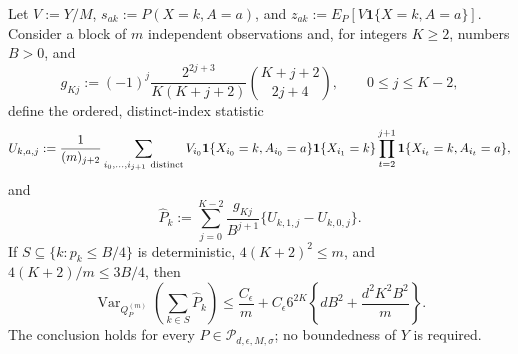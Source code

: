 Let \(V:=Y/M\), \(s_{ak}:=P(X=k,A=a)\), and \(z_{ak}:=E_P[V\mathbf 1\{X=k,A=a\}]\).  Consider a block of \(m\) independent observations and, for integers \(K\ge2\), numbers \(B>0\), and
\[
 g_{Kj}:=(-1)^j\frac{2^{2j+3}}{K(K+j+2)}\binom{K+j+2}{2j+4},\qquad 0\le j\le K-2,
\]
define the ordered, distinct-index statistic
\[
 U_{k,a,j}:=\frac{1}{(m)_{j+2}}
 \sum_{i_0,\ldots,i_{j+1}\ {\rm distinct}}
 V_{i_0}\mathbf 1\{X_{i_0}=k,A_{i_0}=a\}
 \mathbf 1\{X_{i_1}=k\}
 \prod_{t=2}^{j+1}\mathbf 1\{X_{i_t}=k,A_{i_t}=a\},
\]
and
\[
 \widehat P_k:=\sum_{j=0}^{K-2}\frac{g_{Kj}}{B^{j+1}}
 \{U_{k,1,j}-U_{k,0,j}\}.
\]
If \(S\subseteq\{k:p_k\le B/4\}\) is deterministic, \(4(K+2)^2\le m\), and \(4(K+2)/m\le3B/4\), then
\[
 \operatorname{Var}_{Q_P^{(m)}}\!\left(\sum_{k\in S}\widehat P_k\right)
 \le \frac{C_{\epsilon}}m+C_{\epsilon}6^{2K}
 \left\{dB^2+\frac{d^2K^2B^2}{m}\right\}.
\]
The conclusion holds for every \(P\in\mathcal P_{d,\epsilon,M,\sigma}\); no boundedness of \(Y\) is required.